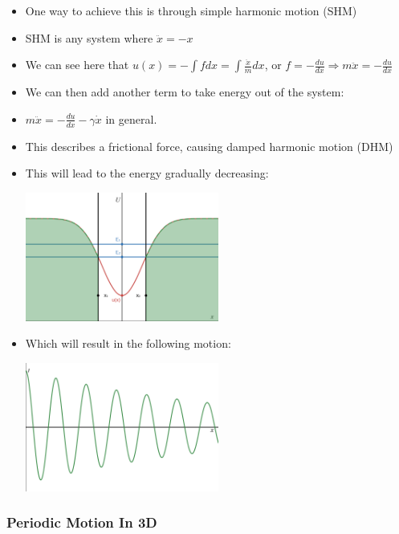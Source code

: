 \documentclass{article}
\begin{document}
\begin{itemize}

    \item One way to achieve this is through simple harmonic motion (SHM)
    \item SHM is any system where \(\ddot x = -x\)
    \item We can see here that \(u(x) = -\int f dx = \int\frac{\ddot x}{m}dx\), 
    or \(f = -\frac{du}{dx} \Rightarrow m\ddot x = -\frac{du}{dx}\)
    \item We can then add another term to take energy out of the system:
    \item \(m\ddot x = -\frac{du}{dx} - \gamma\dot x\) in general. 
    \item This describes a frictional force, causing damped harmonic motion (DHM)
    \item This will lead to the energy gradually decreasing:
    
    \includegraphics[width = 0.5\textwidth]
    {year1/wfmp/periodic-motion/potential-with-smaller-bounds.png}

    \item Which will result in the following motion:

    \includegraphics[width = 0.5\textwidth]{year1/wfmp/periodic-motion/DHM.png}
\end{itemize}

\subsubsection*{Periodic Motion In 3D}
\end{document}

